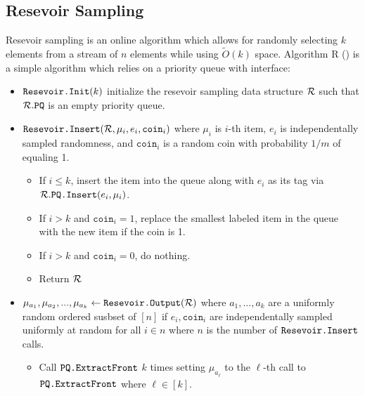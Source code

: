 \subsection{Resevoir Sampling}
Resevoir sampling is an online algorithm which allows for randomly selecting
$k$ elements from a stream of $n$ elements while using $\tilde{O}(k)$ space.
Algorithm R (\cite{vitter1985random}) is a simple algorithm which relies on a priority queue with interface:
\begin{itemize}
	\item $\texttt{Resevoir.Init}(k)$ initialize the resevoir sampling data structure $\mathcal{R}$ such that $\mathcal{R}.\texttt{PQ}$  is an empty priority queue.
	\item $\texttt{Resevoir.Insert}(\mathcal{R}, \mu_i, e_i, \texttt{coin}_i)$ where $\mu_i$ is $i$-th item, $e_i$ is independentally sampled randomness,
	      and $\texttt{coin}_i$ is a random coin with probability $1/m$ of equaling 1.
	      \begin{itemize}
		      \item If $i \leq k$, insert the item into the queue along with $e_i$ as its tag via $\mathcal{R}.\texttt{PQ.Insert}(e_i, \mu_i)$.
		      \item If $i > k$ and $\texttt{coin}_i = 1$, replace the smallest labeled item in the queue with the new item if the coin is 1.
		      \item If $i > k$ and $\texttt{coin}_i = 0$, do nothing.
					\item Return $\mathcal{R}$
	      \end{itemize}

	\item  $\mu_{a_1}, \mu_{a_2}, ..., \mu_{a_k} \gets \texttt{Resevoir.Output}(\mathcal{R})$ where $a_1, ..., a_k$ are a uniformly random ordered susbset of $[n]$
	if $e_i, \texttt{coin}_i$ are independentally sampled uniformly at random for all $i \in n$ where $n$ is the number of $\texttt{Resevoir.Insert}$ calls.
	      \begin{itemize}
		      \item Call $\texttt{PQ.ExtractFront}$ $k$ times setting $\mu_{a_\ell}$ to the $\ell$-th call to $\texttt{PQ.ExtractFront}$ where $\ell \in [k]$.
	      \end{itemize}
\end{itemize}

